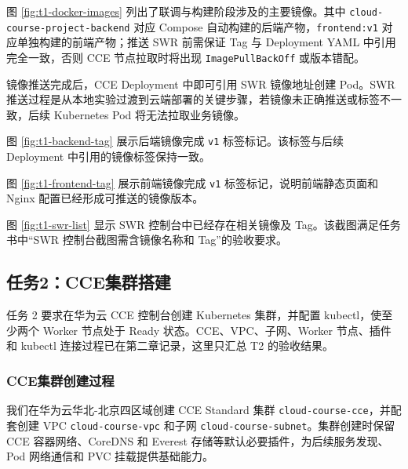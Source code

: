 
图 \ref{fig:t1-docker-images} 列出了联调与构建阶段涉及的主要镜像。其中 \verb|cloud-course-project-backend| 对应 Compose 自动构建的后端产物，\verb|frontend:v1| 对应单独构建的前端产物；推送 SWR 前需保证 Tag 与 Deployment YAML 中引用完全一致，否则 CCE 节点拉取时将出现 \verb|ImagePullBackOff| 或版本错配。

镜像推送完成后，CCE Deployment 中即可引用 SWR 镜像地址创建 Pod。SWR 推送过程是从本地实验过渡到云端部署的关键步骤，若镜像未正确推送或标签不一致，后续 Kubernetes Pod 将无法拉取业务镜像。


图 \ref{fig:t1-backend-tag} 展示后端镜像完成 \verb|v1| 标签标记。该标签与后续 Deployment 中引用的镜像标签保持一致。


图 \ref{fig:t1-frontend-tag} 展示前端镜像完成 \verb|v1| 标签标记，说明前端静态页面和 Nginx 配置已经形成可推送的镜像版本。


图 \ref{fig:t1-swr-list} 显示 SWR 控制台中已经存在相关镜像及 Tag。该截图满足任务书中“SWR 控制台截图需含镜像名称和 Tag”的验收要求。

\subsection{任务2：CCE集群搭建}

任务 2 要求在华为云 CCE 控制台创建 Kubernetes 集群，并配置 kubectl，使至少两个 Worker 节点处于 Ready 状态。CCE、VPC、子网、Worker 节点、插件和 kubectl 连接过程已在第二章记录，这里只汇总 T2 的验收结果。

\subsubsection{CCE集群创建过程}

我们在华为云华北-北京四区域创建 CCE Standard 集群 \verb|cloud-course-cce|，并配套创建 VPC \verb|cloud-course-vpc| 和子网 \verb|cloud-course-subnet|。集群创建时保留 CCE 容器网络、CoreDNS 和 Everest 存储等默认必要插件，为后续服务发现、Pod 网络通信和 PVC 挂载提供基础能力。

